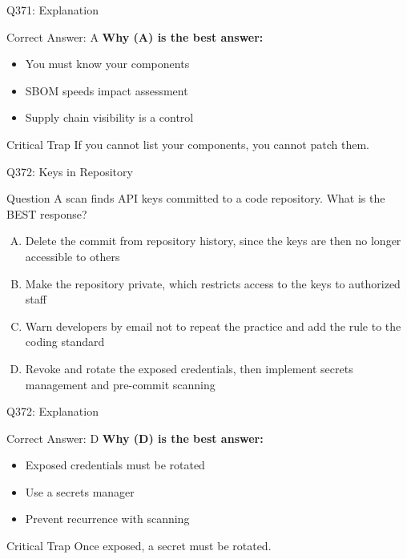 \documentclass{beamer}
\begin{document}
	\begin{frame}{Q371: Explanation}
		\begin{block}{Correct Answer: A}
			\textbf{Why (A) is the best answer:}
			\begin{itemize}
				\item You must know your components
				\item SBOM speeds impact assessment
				\item Supply chain visibility is a control
			\end{itemize}
		\end{block}
		\begin{alertblock}{Critical Trap}
			If you cannot list your components, you cannot patch them.
		\end{alertblock}
	\end{frame}
	
	\begin{frame}{Q372: Keys in Repository}
		\begin{block}{Question}
			\small A scan finds API keys committed to a code repository. What is the BEST response?
		\end{block}
		\begin{enumerate}[(A)]
			\footnotesize
			\item Delete the commit from repository history, since the keys are then no longer accessible to others
			\item Make the repository private, which restricts access to the keys to authorized staff
			\item Warn developers by email not to repeat the practice and add the rule to the coding standard
			\item Revoke and rotate the exposed credentials, then implement secrets management and pre-commit scanning
		\end{enumerate}
	\end{frame}
	
	\begin{frame}{Q372: Explanation}
		\begin{block}{Correct Answer: D}
			\textbf{Why (D) is the best answer:}
			\begin{itemize}
				\item Exposed credentials must be rotated
				\item Use a secrets manager
				\item Prevent recurrence with scanning
			\end{itemize}
		\end{block}
		\begin{alertblock}{Critical Trap}
			Once exposed, a secret must be rotated.
		\end{alertblock}
	\end{frame}
	
\end{document}
